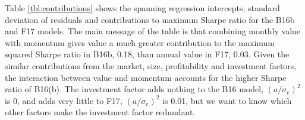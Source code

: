 
Table \ref{tbl:contributions} shows the spanning regression intercepts, standard deviation
of residuals and contributions to maximum Sharpe ratio for the B16b and F17 models. The
main message of the table is that combining monthly value with momentum gives value a much
greater contribution to the maximum squared Sharpe ratio in B16b, 0.18, than annual value
in F17, 0.03. Given the similar contributions from the market, size, profitability and
investment factors, the interaction between value and momentum accounts for the higher
Sharpe ratio of B16(b). The investment factor adds nothing to the B16 model,
$(a/\sigma_e)^2$ is 0, and adds very little to F17, $(a/\sigma_e)^2$ is 0.01, but we want
to know which other factors make the investment factor redundant.


